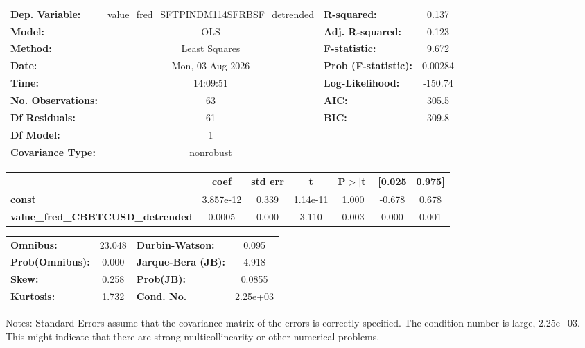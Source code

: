 \begin{center}
\begin{tabular}{lclc}
\toprule
\textbf{Dep. Variable:}                   & value\_fred\_SFTPINDM114SFRBSF\_detrended & \textbf{  R-squared:         } &     0.137   \\
\textbf{Model:}                           &                    OLS                    & \textbf{  Adj. R-squared:    } &     0.123   \\
\textbf{Method:}                          &               Least Squares               & \textbf{  F-statistic:       } &     9.672   \\
\textbf{Date:}                            &              Mon, 03 Aug 2026             & \textbf{  Prob (F-statistic):} &  0.00284    \\
\textbf{Time:}                            &                  14:09:51                 & \textbf{  Log-Likelihood:    } &   -150.74   \\
\textbf{No. Observations:}                &                       63                  & \textbf{  AIC:               } &     305.5   \\
\textbf{Df Residuals:}                    &                       61                  & \textbf{  BIC:               } &     309.8   \\
\textbf{Df Model:}                        &                        1                  & \textbf{                     } &             \\
\textbf{Covariance Type:}                 &                 nonrobust                 & \textbf{                     } &             \\
\bottomrule
\end{tabular}
\begin{tabular}{lcccccc}
                                          & \textbf{coef} & \textbf{std err} & \textbf{t} & \textbf{P$> |$t$|$} & \textbf{[0.025} & \textbf{0.975]}  \\
\midrule
\textbf{const}                            &    3.857e-12  &        0.339     &  1.14e-11  &         1.000        &       -0.678    &        0.678     \\
\textbf{value\_fred\_CBBTCUSD\_detrended} &       0.0005  &        0.000     &     3.110  &         0.003        &        0.000    &        0.001     \\
\bottomrule
\end{tabular}
\begin{tabular}{lclc}
\textbf{Omnibus:}       & 23.048 & \textbf{  Durbin-Watson:     } &    0.095  \\
\textbf{Prob(Omnibus):} &  0.000 & \textbf{  Jarque-Bera (JB):  } &    4.918  \\
\textbf{Skew:}          &  0.258 & \textbf{  Prob(JB):          } &   0.0855  \\
\textbf{Kurtosis:}      &  1.732 & \textbf{  Cond. No.          } & 2.25e+03  \\
\bottomrule
\end{tabular}
\end{center}

Notes: \newline
 [1] Standard Errors assume that the covariance matrix of the errors is correctly specified. \newline
 [2] The condition number is large, 2.25e+03. This might indicate that there are \newline
 strong multicollinearity or other numerical problems.